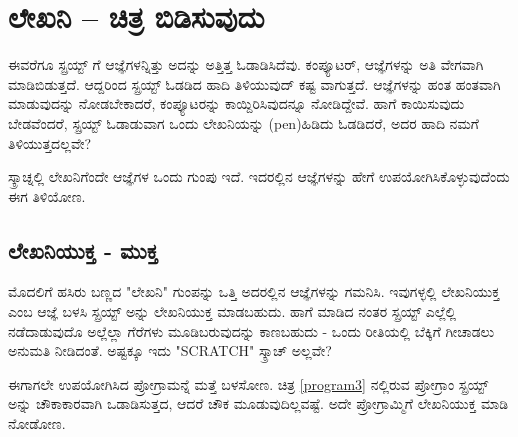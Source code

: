 \chapter{ಲೇಖನಿ – ಚಿತ್ರ ಬಿಡಿಸುವುದು}
ಈವರೆಗೂ ಸ್ಪ್ರಯ್ಟ್ ಗೆ ಆಜ್ಞೆಗಳನ್ನಿತ್ತು ಅದನ್ನು ಅತ್ತಿತ್ತ ಓಡಾಡಿಸಿದೆವು.  ಕಂಪ್ಯೂಟರ್, ಆಜ್ಞೆಗಳನ್ನು  ಅತಿ ವೇಗವಾಗಿ ಮಾಡಿಬಿಡುತ್ತದೆ.  ಆದ್ದರಿಂದ ಸ್ಪ್ರಯ್ಟ್ ಓಡಡಿದ ಹಾದಿ ತಿಳಿಯುವುದ್ ಕಷ್ಟ ವಾಗುತ್ತದೆ.  ಆಜ್ಞೆಗಳನ್ನು ಹಂತ ಹಂತವಾಗಿ ಮಾಡುವುದನ್ನು ನೋಡಬೇಕಾದರೆ, ಕಂಪ್ಯೂಟರನ್ನು ಕಾಯ್ದಿರಿಸಿವುದನ್ನೂ ನೋಡಿದ್ದೇವೆ. ಹಾಗೆ ಕಾಯಿಸುವುದು ಬೇಡವೆಂದರೆ, ಸ್ಪ್ರಯ್ಟ್ ಓಡಾಡುವಾಗ ಒಂದು ಲೇಖನಿಯನ್ನು (\textenglish{pen})ಹಿಡಿದು ಓಡಡಿದರೆ, ಅದರ ಹಾದಿ ನಮಗೆ ತಿಳಿಯುತ್ತದಲ್ಲವೇ? 

ಸ್ಕ್ರಾಚ್ನಲ್ಲಿ ಲೇಖನಿಗೆಂದೇ ಆಜ್ಞೆಗಳ ಒಂದು ಗುಂಪು ಇದೆ. ಇದರಲ್ಲಿನ ಆಜ್ಞೆಗಳನ್ನು ಹೇಗೆ ಉಪಯೋಗಿಸಿಕೊಳ್ಳುವುದೆಂದು ಈಗ ತಿಳಿಯೋಣ. 
\section{ಲೇಖನಿಯುಕ್ತ - ಮುಕ್ತ}
ಮೊದಲಿಗೆ ಹಸಿರು ಬಣ್ಣದ "ಲೇಖನಿ" ಗುಂಪನ್ನು ಒತ್ತಿ ಅದರಲ್ಲಿನ ಆಜ್ಞೆಗಳನ್ನು ಗಮನಿಸಿ.  ಇವುಗಳ್ಳಲ್ಲಿ ಲೇಖನಿಯುಕ್ತ ಎಂಬ  ಆಜ್ಞೆ ಬಳಸಿ ಸ್ಪ್ರಯ್ಟ್ ಅನ್ನು ಲೇಖನಿಯುಕ್ತ ಮಾಡಬಹುದು. ಹಾಗೆ ಮಾಡಿದ ನಂತರ ಸ್ಪ್ರಯ್ಟ್ ಎಲ್ಲೆಲ್ಲಿ ನಡೆದಾಡುವುದೊ ಅಲ್ಲೆಲ್ಲಾ ಗೆರೆಗಳು ಮೂಡಿಬರುವುದನ್ನು ಕಾಣಬಹುದು - ಒಂದು ರೀತಿಯಲ್ಲಿ ಬೆಕ್ಕಿಗೆ ಗೀಚಾಡಲು ಅನುಮತಿ ನೀಡಿದಂತೆ.  ಅಷ್ಟಕ್ಕೂ ಇದು "\textenglish{SCRATCH}" ಸ್ಕ್ರಾಚ್ ಅಲ್ಲವೇ? 

ಈಗಾಗಲೇ ಉಪಯೋಗಿಸಿದ ಪ್ರೋಗ್ರಾಮನ್ನೆ ಮತ್ತೆ ಬಳಸೋಣ.  ಚಿತ್ರ \ref{program3} ನಲ್ಲಿರುವ ಪ್ರೋಗ್ರಾಂ ಸ್ಪ್ರಯ್ಟ್ ಅನ್ನು ಚೌಕಾಕಾರವಾಗಿ ಒಡಾಡಿಸುತ್ತದ,  ಆದರೆ ಚೌಕ ಮೂಡುವುದಿಲ್ಲವಷ್ಟೆ. ಅದೇ ಪ್ರೋಗ್ರಾಮ್ಮಿಗೆ ಲೇಖನಿಯುಕ್ತ ಮಾಡಿ ನೋಡೋಣ.

